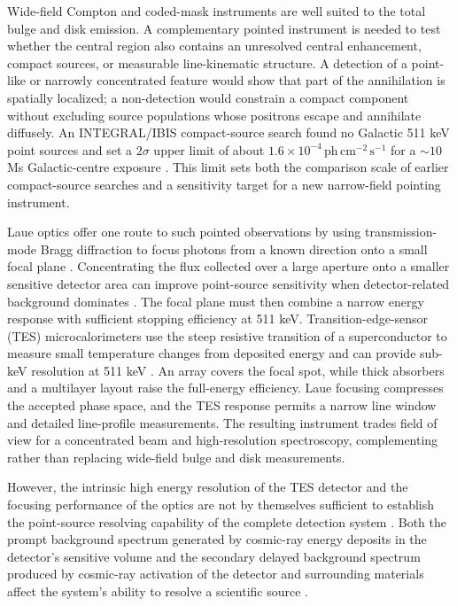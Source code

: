 \documentclass[11pt]{article}
\newcommand{\phcms}{\ensuremath{\,\mathrm{ph\,cm^{-2}\,s^{-1}}}}
\begin{document}
Wide-field Compton and coded-mask instruments are well suited to the total
bulge and disk emission. A complementary pointed instrument is needed to test
whether the central region also contains an unresolved central enhancement,
compact sources, or measurable line-kinematic structure. A detection of a
point-like or narrowly concentrated feature would show that part of the
annihilation is spatially localized; a non-detection would constrain a compact
component without excluding source populations whose positrons escape and
annihilate diffusely. An INTEGRAL/IBIS compact-source search found no Galactic
511 keV point sources and set a $2\sigma$ upper limit of about
$1.6\times10^{-4}\phcms$ for a $\sim10$ Ms Galactic-centre exposure
\cite{DeCesare2011}. This limit sets both the comparison scale of earlier
compact-source searches and a sensitivity target for a new narrow-field
pointing instrument.

Laue optics offer one route to such pointed observations by using
transmission-mode Bragg diffraction to focus photons from a known direction
onto a small focal plane \cite{Barriere2009Laue,Barriere2011LauePrototype}.
Concentrating the flux collected over a large aperture onto a smaller sensitive
detector area can improve point-source sensitivity when detector-related
background dominates \cite{Weidenspointner2006MAX}. The focal plane must then
combine a narrow energy response with sufficient stopping efficiency at
511 keV. Transition-edge-sensor (TES) microcalorimeters use the steep
resistive transition of a superconductor to measure small temperature changes
from deposited energy and can provide sub-keV resolution at 511 keV
\cite{Shirazi2023,Zhang2022TESGamma}. An array covers the focal spot, while thick absorbers and a
multilayer layout raise the full-energy efficiency. Laue focusing compresses
the accepted phase space, and the TES response permits a narrow line window and
detailed line-profile measurements. The resulting instrument trades field of
view for a concentrated beam and high-resolution spectroscopy, complementing
rather than replacing wide-field bulge and disk measurements.

However, the intrinsic high energy resolution of the TES detector and the
focusing performance of the optics are not by themselves sufficient to
establish the point-source resolving capability of the complete detection
system \cite{Shirazi2023,Hu2026}. Both the prompt background spectrum generated
by cosmic-ray energy deposits in the detector's sensitive volume and the
secondary delayed background spectrum produced by cosmic-ray activation of the
detector and surrounding materials affect the system's ability to resolve a
scientific source \cite{Gallego2025Balloon,Tian2026DIXE}.
\end{document}
